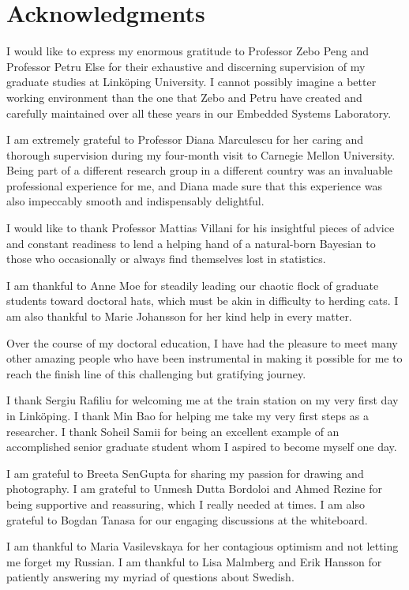\chapter*{Acknowledgments}

I would like to express my enormous gratitude to Professor Zebo Peng and
Professor Petru Else for their exhaustive and discerning supervision of my
graduate studies at Linköping University. I cannot possibly imagine a better
working environment than the one that Zebo and Petru have created and carefully
maintained over all these years in our Embedded Systems Laboratory.

I am extremely grateful to Professor Diana Marculescu for her caring and
thorough supervision during my four-month visit to Carnegie Mellon University.
Being part of a different research group in a different country was an
invaluable professional experience for me, and Diana made sure that this
experience was also impeccably smooth and indispensably delightful.

I would like to thank Professor Mattias Villani for his insightful pieces of
advice and constant readiness to lend a helping hand of a natural-born Bayesian
to those who occasionally or always find themselves lost in statistics.

I am thankful to Anne Moe for steadily leading our chaotic flock of graduate
students toward doctoral hats, which must be akin in difficulty to herding cats.
I am also thankful to Marie Johansson for her kind help in every matter.

Over the course of my doctoral education, I have had the pleasure to meet many
other amazing people who have been instrumental in making it possible for me to
reach the finish line of this challenging but gratifying journey.

I thank Sergiu Rafiliu for welcoming me at the train station on my very first
day in Linköping. I thank Min Bao for helping me take my very first steps as a
researcher. I thank Soheil Samii for being an excellent example of an
accomplished senior graduate student whom I aspired to become myself one day.

I am grateful to Breeta SenGupta for sharing my passion for drawing and
photography. I am grateful to Unmesh Dutta Bordoloi and Ahmed Rezine for being
supportive and reassuring, which I really needed at times. I am also grateful to
Bogdan Tanasa for our engaging discussions at the whiteboard.

I am thankful to Maria Vasilevskaya for her contagious optimism and not letting
me forget my Russian. I am thankful to Lisa Malmberg and Erik Hansson for
patiently answering my myriad of questions about Swedish.


